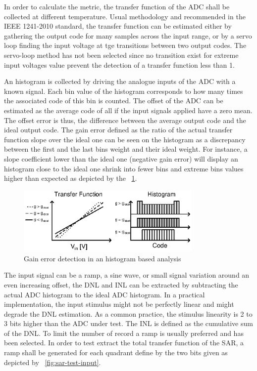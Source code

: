 In order to calculate the metric, the transfer function of the ADC shall be collected at different temperature. Usual methodology and recommended in the 
IEEE 1241-2010 standard, the transfer function can be estimated either by gathering the output code for many samples across the input range, or by a servo loop finding the input voltage at tge transitions between two output codes. The servo-loop method has not been selected since no transition exist for extreme input voltages value prevent the detection of a transfer function less than 1.

An histogram is collected by driving the analogue inputs of the ADC with a known signal. Each bin value of the histogram corresponds to how many times the associated code of this bin is counted. The offset of the ADC can be estimated as the average code of all if the input signals applied have a zero mean. The offset error is thus, the difference between the average output code and the ideal output code. The gain error defined as the ratio of the actual transfer function slope over the ideal one can be seen on the histogram as a discrepancy between the first and the last bins weight and their ideal weight. For instance, a slope coefficient lower than the ideal one (negative gain error) will display an histogram close to the ideal one shrink into fewer bins and extreme bins values higher than expected as depicted by the \figurename~\ref{fig:gain-error-hist}.

\begin{figure}[htp]
    \centering
    \includegraphics[width=0.8\textwidth]{Chapter5/Figs/sar_test/histogram_gain_error.ps}
    \caption{Gain error detection in an histogram based analysis}
    \label{fig:gain-error-hist}
\end{figure}

The input signal can be a ramp, a sine wave, or small signal variation around an even increasing offset, the DNL and INL can be extracted by subtracting the actual ADC histogram to the ideal ADC histogram. In a practical implementation, the input stimulus might not be perfectly linear and might degrade the DNL estimation. As a common practice, the stimulus linearity is 2 to 3 bits higher than the ADC under test. The INL is defined as the cumulative sum of the DNL\@. To limit the number of record a ramp is usually preferred and has been selected. In order to test extract the total transfer function of the SAR, a ramp shall be generated for each quadrant define by the two bits given as depicted by \figurename~\ref{fig:sar-test-input}.

